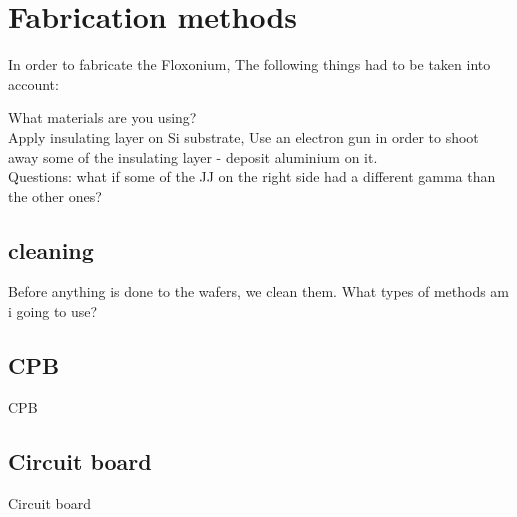 \chapter{Fabrication methods}


In order to fabricate the Floxonium, The following things had to be taken into account: 

    What materials are you using?
    \\
    Apply insulating layer on Si substrate, Use an electron gun in order to shoot away some of the insulating layer - deposit aluminium on it.
    \\
    Questions: 
        what if some of the JJ on the right side had a different gamma than the other ones? 
\section{cleaning}
Before anything is done to the wafers, we clean them. 
What types of methods am i going to use? 

\section{CPB}

CPB 
\section{Circuit board}
Circuit board 


 





